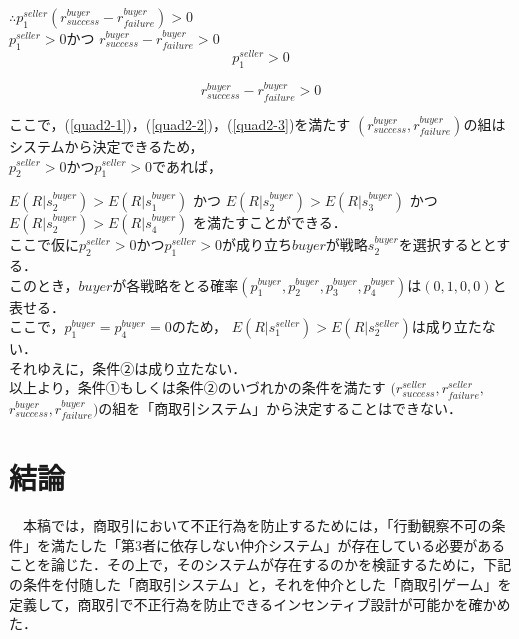 \documentclass[twocolumn, a4j]{article}
\begin{document}
$\therefore p^{seller}_1(r^{buyer}_{success} - r^{buyer}_{failure}) > 0$\\

$ p^{seller}_1 > 0$かつ
$ r^{buyer}_{success} - r^{buyer}_{failure} > 0$\\

\begin{equation}
  p^{seller}_1 > 0
\end{equation}

\begin{equation}
  \label{quad2-3}
  r^{buyer}_{success} - r^{buyer}_{failure} > 0
\end{equation}

ここで，(\ref{quad2-1})，(\ref{quad2-2})，(\ref{quad2-3})を満たす
$ (r^{buyer}_{success}, r^{buyer}_{failure})$の組はシステムから決定できるため，\\

$p^{seller}_2>0$かつ$p^{seller}_1>0$であれば，

$E(R|s^{buyer}_2)>E(R|s^{buyer}_1)$
かつ
$E(R|s^{buyer}_2) > E(R|s^{buyer}_3)$
かつ
$E(R|s^{buyer}_2) > E(R|s^{buyer}_4)$
を満たすことができる．\\

ここで仮に$p^{seller}_2>0$かつ$p^{seller}_1>0$が成り立ち$ buyer$が戦略$ s^{buyer}_2$を選択するととする．\\

このとき，$buyer$が各戦略をとる確率$(p^{buyer}_1, p^{buyer}_2, p^{buyer}_3, p^{buyer}_4)$は$ (0, 1, 0, 0)$と表せる．\\

ここで，$ p^{buyer}_1 = p^{buyer}_4 = 0$のため，
$E(R |s^{seller}_1) > E(R |s^{seller}_2)$は成り立たない．\\

それゆえに，条件②は成り立たない．\\

以上より，条件①もしくは条件②のいづれかの条件を満たす
$(r^{seller}_{success}, r^{seller}_{failure},$
$r^{buyer}_{success},r^{buyer}_{failure})$の組を「商取引システム」から決定することはできない．\\

\twocolumn
\section{結論}
  　本稿では，商取引において不正行為を防止するためには，「行動観察不可の条件」を満たした「第3者に依存しない仲介システム」が存在している必要があることを論じた．その上で，そのシステムが存在するのかを検証するために，下記の条件を付随した「商取引システム」と，それを仲介とした「商取引ゲーム」を定義して，商取引で不正行為を防止できるインセンティブ設計が可能かを確かめた．
\end{document}
